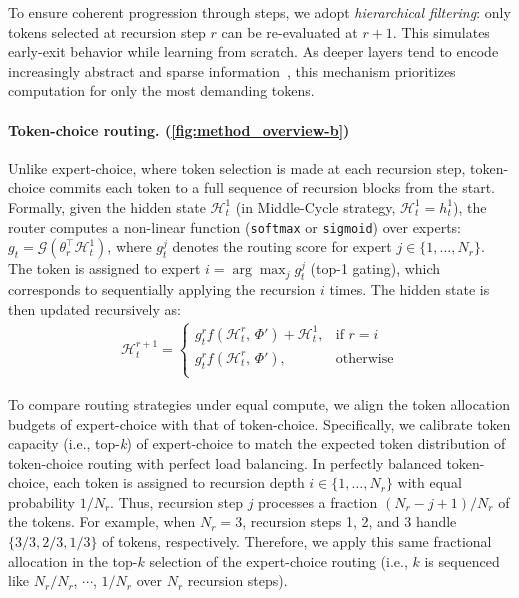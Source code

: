 To ensure coherent progression through steps, we adopt \textit{hierarchical filtering}: only tokens selected at recursion step $r$ can be re-evaluated at $r{+}1$. This simulates early-exit behavior while learning from scratch. As deeper layers tend to encode increasingly abstract and sparse information~\citep{li2022lazy, yang2024pyramidinfer, nawrot2024dynamic}, this mechanism prioritizes computation for only the most demanding tokens.


\vspace{-10pt}
\paragraph{Token-choice routing. (\autoref{fig:method_overview-b})}  Unlike expert-choice, where token selection is made at each recursion step, token-choice commits each token to a full sequence of recursion blocks from the start.
Formally, given the hidden state $\mathcal{H}_t^1$ (in Middle-Cycle strategy, $\mathcal{H}_t^1 = h_t^1$), the router computes a non-linear function (\texttt{softmax} or \texttt{sigmoid}) over experts: ${g}_t = \mathcal{G}(\theta_r^\top \mathcal{H}_t^1)$, where $g_t^j$ denotes the routing score for expert $j \in \{1,\dots,N_r\}$. The token is assigned to expert $i = \arg\max_j g_t^j$ (top-1 gating), which corresponds to sequentially applying the recursion $i$ times. The hidden state is then updated recursively as:
\begin{align}
\mathcal{H}_t^{r+1} =
\begin{cases}
g_t^r f(\mathcal{H}_t^r,\, \Phi') + \mathcal{H}_t^1, & \text{if } r = i  \\
g_t^r f(\mathcal{H}_t^r,\, \Phi'), & \text{otherwise} \\
\end{cases}
\end{align}

To compare routing strategies under equal compute, we align the token allocation budgets of expert-choice with that of token-choice. Specifically, we calibrate token capacity (i.e., top-\textit{k}) of expert-choice to match the expected token distribution of token-choice routing with perfect load balancing. 
In perfectly balanced token-choice, each token is assigned to recursion depth $i \in \{1, \dots, N_r\}$ with equal probability $1/N_r$. Thus, recursion step $j$ processes a fraction $(N_r - j + 1)/N_r$ of the tokens. For example, when $N_r = 3$, recursion steps 1, 2, and 3 handle $\{3/3, 2/3, 1/3\}$ of tokens, respectively. Therefore, we apply this same fractional allocation in the top-$k$ selection of the expert-choice routing (i.e., $k$ is sequenced like $N_r / N_r$, $\cdots$, $1 / N_r$ over $N_r$ recursion steps).


